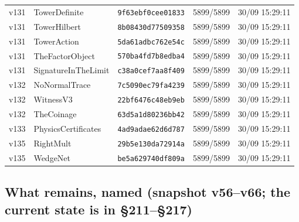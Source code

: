 \documentclass[11pt]{article}
\theoremstyle{definition}\newtheorem{deriv}{Derivation}
\begin{document}
{\begin{longtable}{@{}lllll@{}}
v131 & TowerDefinite & \texttt{9f63ebf0cee01833} & 5899/5899 & 30/09 15:29:11 \\
v131 & TowerHilbert & \texttt{8b08430d77509358} & 5899/5899 & 30/09 15:29:11 \\
v131 & TowerAction & \texttt{5da61adbc762e54c} & 5899/5899 & 30/09 15:29:11 \\
v131 & TheFactorObject & \texttt{570ba4fd7b8edba4} & 5899/5899 & 30/09 15:29:11 \\
v131 & SignatureInTheLimit & \texttt{c38a0cef7aa8f409} & 5899/5899 & 30/09 15:29:11 \\
v132 & NoNormalTrace & \texttt{7c5090ec79fa4239} & 5899/5899 & 30/09 15:29:11 \\
v132 & WitnessV3 & \texttt{22bf6476c48eb9eb} & 5899/5899 & 30/09 15:29:11 \\
v132 & TheCoinage & \texttt{63d5a1d80236bb42} & 5899/5899 & 30/09 15:29:11 \\
v133 & PhysicsCertificates & \texttt{4ad9adae62d6d787} & 5899/5899 & 30/09 15:29:11 \\
v135 & RightMult & \texttt{29b5e130da72914a} & 5899/5899 & 30/09 15:29:11 \\
v135 & WedgeNet & \texttt{be5a629740df809a} & 5899/5899 & 30/09 15:29:11 \\
\bottomrule\end{longtable}}

\subsection*{What remains, named (snapshot v56--v66; the current state is in \S211--\S217)}
\end{document}
